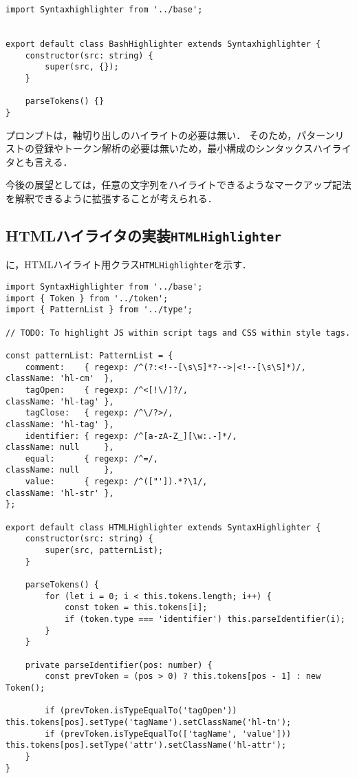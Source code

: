 \documentclass[autodetect-engine,dvi=dvipdfmx,ja=standard,
               a4j,11pt]{bxjsarticle}
\newcommand{\figref}[1]{\makebox{図~\ref{#1}}}
\begin{document}
\begin{lstlisting}[caption={プロンプトハイライタ({\tt bash.ts})}, label={prog:bash}]
import Syntaxhighlighter from '../base';


export default class BashHighlighter extends Syntaxhighlighter {
    constructor(src: string) {
        super(src, {});
    }

    parseTokens() {}
}
\end{lstlisting}

プロンプトは，軸切り出しのハイライトの必要は無い．
そのため，パターンリストの登録やトークン解析の必要は無いため，最小構成のシンタックスハイライタとも言える．

今後の展望としては，任意の文字列をハイライトできるようなマークアップ記法を解釈できるように拡張することが考えられる．

\subsection{HTMLハイライタの実装{\tt HTMLHighlighter}}

\figref{prog:html}に，HTMLハイライト用クラス\verb|HTMLHighlighter|を示す．

\begin{lstlisting}[caption={HTMLハイライタ({\tt html.ts})}, label={prog:html}]
import SyntaxHighlighter from '../base';
import { Token } from '../token';
import { PatternList } from '../type';

// TODO: To highlight JS within script tags and CSS within style tags.
 
const patternList: PatternList = {
    comment:    { regexp: /^(?:<!--[\s\S]*?-->|<!--[\s\S]*)/, className: 'hl-cm'  },
    tagOpen:    { regexp: /^<[!\/]?/,                         className: 'hl-tag' },
    tagClose:   { regexp: /^\/?>/,                            className: 'hl-tag' },
    identifier: { regexp: /^[a-zA-Z_][\w:.-]*/,               className: null     },
    equal:      { regexp: /^=/,                               className: null     },
    value:      { regexp: /^(["']).*?\1/,                     className: 'hl-str' },
};

export default class HTMLHighlighter extends SyntaxHighlighter {
    constructor(src: string) {
        super(src, patternList);
    }

    parseTokens() {
        for (let i = 0; i < this.tokens.length; i++) {
            const token = this.tokens[i];
            if (token.type === 'identifier') this.parseIdentifier(i);
        }
    }

    private parseIdentifier(pos: number) {
        const prevToken = (pos > 0) ? this.tokens[pos - 1] : new Token();
        
        if (prevToken.isTypeEqualTo('tagOpen'))              this.tokens[pos].setType('tagName').setClassName('hl-tn');
        if (prevToken.isTypeEqualTo(['tagName', 'value']))   this.tokens[pos].setType('attr').setClassName('hl-attr');
    }
}
\end{lstlisting}
\end{document}
